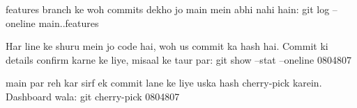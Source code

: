 features branch ke woh commits dekho jo main mein abhi nahi hain:
git log --oneline main..features

Har line ke shuru mein jo code hai, woh us commit ka hash hai. Commit ki details confirm karne ke liye, misaal ke taur par:
git show --stat --oneline 0804807

main par reh kar sirf ek commit lane ke liye uska hash cherry-pick karein. Dashboard wala:
git cherry-pick 0804807